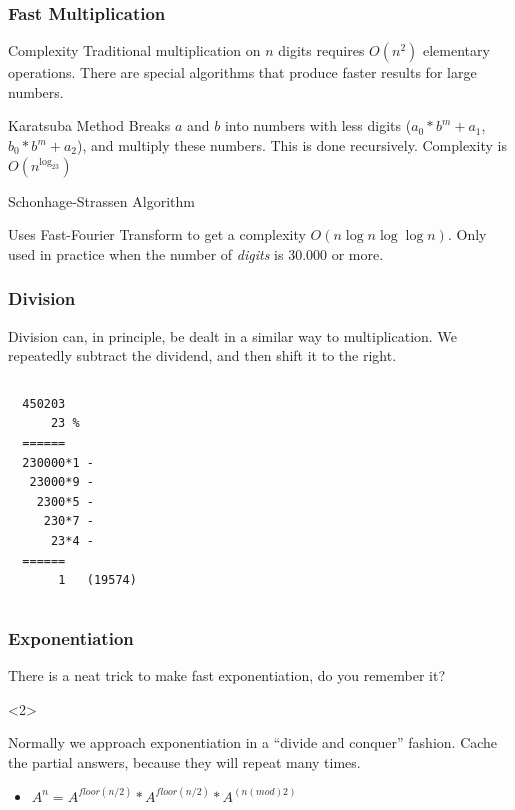 \documentclass{beamer}
\begin{document}
\begin{frame}
  \frametitle{Fast Multiplication} 
  \begin{block}{Complexity}
    {\small
    Traditional multiplication on $n$ digits requires $O(n^2)$
    elementary operations. There are special algorithms that produce
    faster results for large numbers.}
  \end{block}
  \begin{block}{Karatsuba Method}
    {\small
    Breaks $a$ and $b$ into numbers with less digits ($a_0 *b^m +
    a_1$,$b_0 *b^m + a_2$), and multiply these numbers. This is done
    recursively. Complexity is $O(n^{\log_23})$}
  \end{block}
  \begin{block}{Schonhage-Strassen Algorithm}
    {\small 

      Uses Fast-Fourier Transform to get a complexity
      $O(n\log{n}\log\log{n})$. Only used in practice when the number
      of \emph{digits} is 30.000 or more.  
    }
  \end{block}
\end{frame}

\begin{frame}
  \frametitle{Division}
  \begin{block}{}
    Division can, in principle, be dealt in a similar way to
    multiplication. We repeatedly subtract the dividend, and then
    shift it to the right.
  \end{block}

  \begin{columns}[c]
\begin{verbatim}
  450203
      23 %
  ======
  230000*1 -
   23000*9 -
    2300*5 - 
     230*7 -
      23*4 -
  ======
       1   (19574)
\end{verbatim}
  \end{columns}
\end{frame}


\begin{frame}
  \frametitle{Exponentiation}
  \begin{block}{}
    There is a neat trick to make fast exponentiation, do you remember it?
  \end{block}
  \begin{onlyenv}<2>
    \begin{block}{}
      Normally we approach exponentiation in a ``divide and conquer''
      fashion. Cache the partial answers, because they will repeat
      many times.
      \begin{itemize}
      \item $A^n = A^{floor(n/2)} * A^{floor(n/2)} * A^{(n(mod)2)}$
      \end{itemize}
    \end{block}
  \end{onlyenv}
\end{frame}
\end{document}
